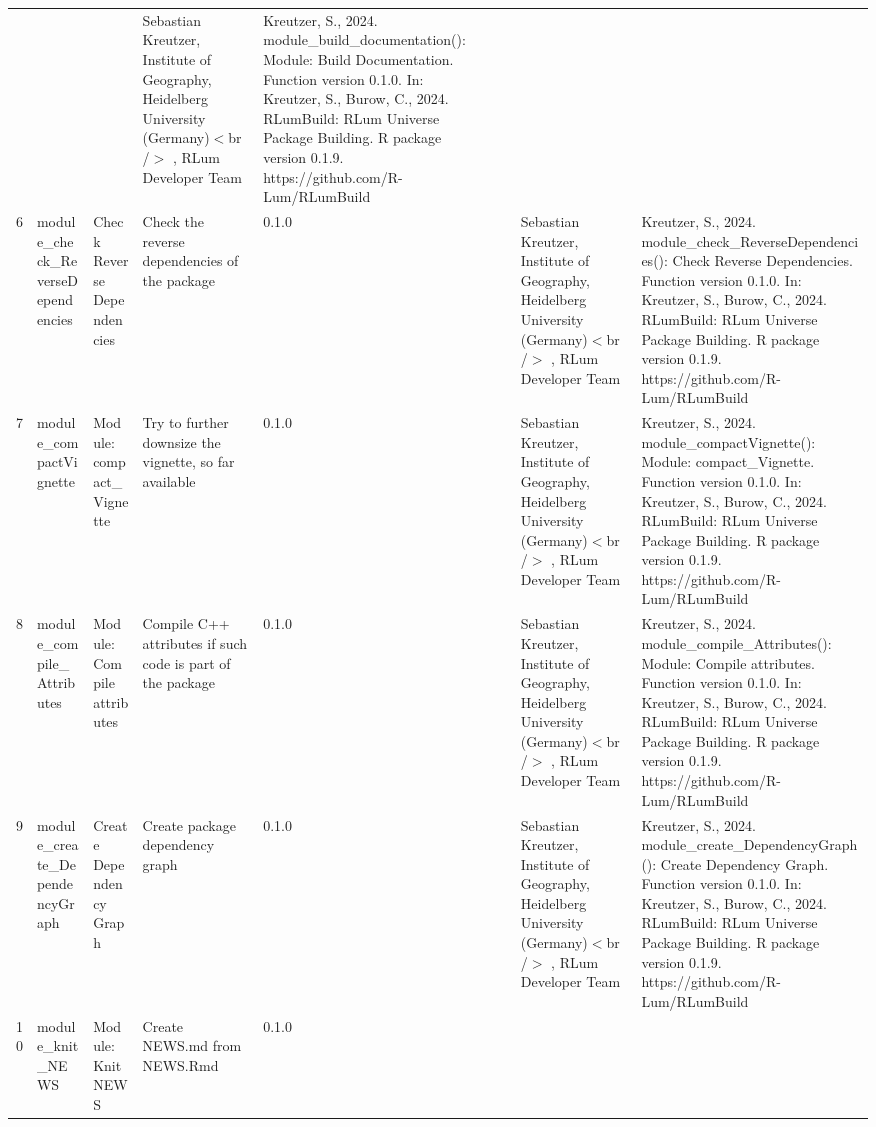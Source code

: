 \begin{table}[ht]
\begin{tabular}{rllllllll}
 &  &  & Sebastian Kreutzer, Institute of Geography, Heidelberg University (Germany)$<$br /$>$ , RLum Developer Team & Kreutzer, S., 2024. module\_build\_documentation(): Module: Build Documentation. Function version 0.1.0. In: Kreutzer, S., Burow, C., 2024. RLumBuild: RLum Universe Package Building. R package version 0.1.9. https://github.com/R-Lum/RLumBuild
 \\ 
  6 & module\_check\_ReverseDependencies & Check Reverse Dependencies & Check the reverse dependencies of the package & 0.1.0
 &  &  & Sebastian Kreutzer, Institute of Geography, Heidelberg University (Germany)$<$br /$>$ , RLum Developer Team & Kreutzer, S., 2024. module\_check\_ReverseDependencies(): Check Reverse Dependencies. Function version 0.1.0. In: Kreutzer, S., Burow, C., 2024. RLumBuild: RLum Universe Package Building. R package version 0.1.9. https://github.com/R-Lum/RLumBuild
 \\ 
  7 & module\_compactVignette & Module: compact\_Vignette & Try to further downsize the vignette, so far available & 0.1.0
 &  &  & Sebastian Kreutzer, Institute of Geography, Heidelberg University (Germany)$<$br /$>$ , RLum Developer Team & Kreutzer, S., 2024. module\_compactVignette(): Module: compact\_Vignette. Function version 0.1.0. In: Kreutzer, S., Burow, C., 2024. RLumBuild: RLum Universe Package Building. R package version 0.1.9. https://github.com/R-Lum/RLumBuild
 \\ 
  8 & module\_compile\_Attributes & Module: Compile attributes & Compile C++ attributes if such code is part of the package & 0.1.0
 &  &  & Sebastian Kreutzer, Institute of Geography, Heidelberg University (Germany)$<$br /$>$ , RLum Developer Team & Kreutzer, S., 2024. module\_compile\_Attributes(): Module: Compile attributes. Function version 0.1.0. In: Kreutzer, S., Burow, C., 2024. RLumBuild: RLum Universe Package Building. R package version 0.1.9. https://github.com/R-Lum/RLumBuild
 \\ 
  9 & module\_create\_DependencyGraph & Create Dependency Graph & Create package dependency graph & 0.1.0
 &  &  & Sebastian Kreutzer, Institute of Geography, Heidelberg University (Germany)$<$br /$>$ , RLum Developer Team & Kreutzer, S., 2024. module\_create\_DependencyGraph(): Create Dependency Graph. Function version 0.1.0. In: Kreutzer, S., Burow, C., 2024. RLumBuild: RLum Universe Package Building. R package version 0.1.9. https://github.com/R-Lum/RLumBuild
 \\ 
  10 & module\_knit\_NEWS & Module: Knit NEWS & Create NEWS.md from NEWS.Rmd & 0.1.0

\end{tabular}
\end{table}
